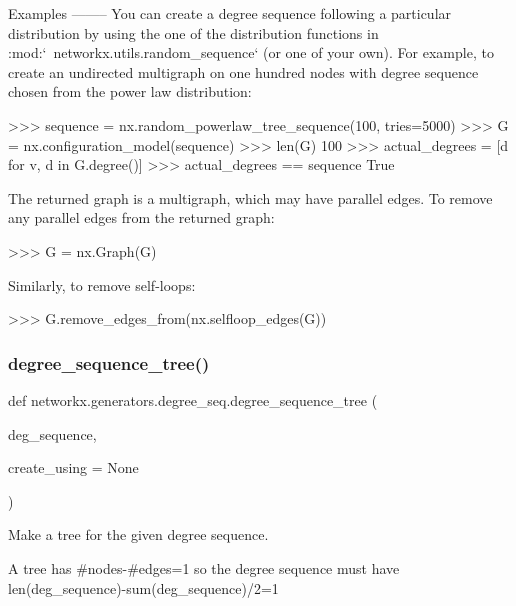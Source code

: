 \begin{DoxyVerb}
Examples
--------
You can create a degree sequence following a particular distribution
by using the one of the distribution functions in
:mod:`~networkx.utils.random_sequence` (or one of your own). For
example, to create an undirected multigraph on one hundred nodes
with degree sequence chosen from the power law distribution:

>>> sequence = nx.random_powerlaw_tree_sequence(100, tries=5000)
>>> G = nx.configuration_model(sequence)
>>> len(G)
100
>>> actual_degrees = [d for v, d in G.degree()]
>>> actual_degrees == sequence
True

The returned graph is a multigraph, which may have parallel
edges. To remove any parallel edges from the returned graph:

>>> G = nx.Graph(G)

Similarly, to remove self-loops:

>>> G.remove_edges_from(nx.selfloop_edges(G))\end{DoxyVerb}
 \mbox{\label{namespacenetworkx_1_1generators_1_1degree__seq_abdef4fbd6e4bed141b552c11d54cfba8}} 
\subsubsection{\texorpdfstring{degree\+\_\+sequence\+\_\+tree()}{degree\_sequence\_tree()}}
{\footnotesize\ttfamily def networkx.\+generators.\+degree\+\_\+seq.\+degree\+\_\+sequence\+\_\+tree (\begin{DoxyParamCaption}\item[{}]{deg\+\_\+sequence,  }\item[{}]{create\+\_\+using = {\ttfamily None} }\end{DoxyParamCaption})}

\begin{DoxyVerb}Make a tree for the given degree sequence.

A tree has #nodes-#edges=1 so
the degree sequence must have
len(deg_sequence)-sum(deg_sequence)/2=1
\end{DoxyVerb}
 \mbox{\label{namespacenetworkx_1_1generators_1_1degree__seq_abaa3b61d4b1f02e7ecbbd6edf407cb85}} 
